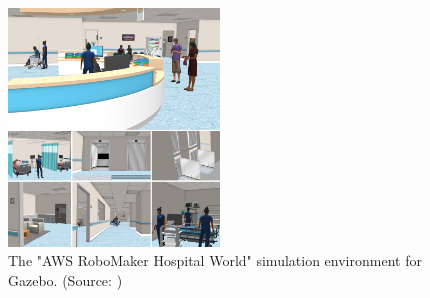\begin{figure}[h]
    \centering
    \includegraphics[width=0.5\textwidth]{figures/30_methods/hospital_world.jpg}
    \caption[The "AWS RoboMaker Hospital World" simulation environment for Gazebo]{The "AWS RoboMaker Hospital World" simulation environment for Gazebo. (Source: \cite{aws_robotics_aws_2023})}
    \label{fig:aws_hospital}
\end{figure}